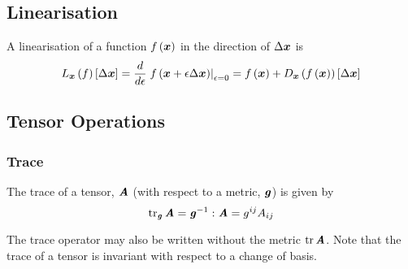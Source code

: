 \subsection{Linearisation}
\label{subsec:Linearisation}

A linearisation of a function $ f\left(  \boldsymbol{x}  \right) $ in the direction of
$\Delta \boldsymbol{x} $ is
\begin{equation}
  \linearisation{f}{\vectr{x}}{\vectr{x}}=\dby{}{\epsilon}\evalat{\fnof{f}{\vectr{x}+\epsilon\linearisationdir{\vectr{x}}}}{\epsilon=0}=\fnof{f}{\vectr{x}}+\directionalderiv{\vectr{x}}{\fnof{f}{\vectr{x}}}{\linearisationdir{\vectr{x}}}
\end{equation}
 
\subsection{Tensor Operations}
\label{subsec:TensorOperations}

\subsubsection{Trace}
\label{subsubsec:Trace}

The trace of a tensor, $\boldsymbol{\mathit{A}}$ (with respect to a metric, $\boldsymbol{\mathit{g}}$) is given by
\begin{equation}
  \trace{\tensor{g}}{\tensor{A}}=\doubledotprod{\inverse{\tensor{g}}}{\tensor{A}}=g^{ij}A_{ij}
\end{equation}

The trace operator may also be written without the metric \ie
$\trace{}{\tensor{A}}$. Note that the trace of a tensor is invariant with
respect to a change of basis.
